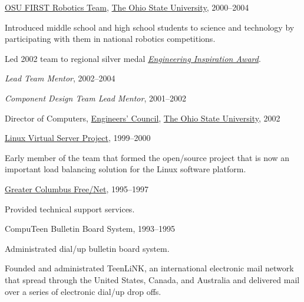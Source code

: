 \documentclass[10pt]{article}
\newcommand{\halfblankline}{\quad\vspace{-0.5\baselineskip}\pagebreak[3]}
\begin{document}
\halfblankline

\href{http://www.osufirst.org/}{OSU FIRST Robotics Team},
\href{http://www.osu.edu}{The Ohio State University}, 2000--2004
\begin{innerlist}
\item Introduced middle school and high school students to science and
        technology by participating with them in national robotics
        competitions.
\item Led 2002 team to regional silver medal
        \href{http://www.firstwiki.org/Engineering_Inspiration_Award}
             {\emph{Engineering Inspiration Award}}.
\item \emph{Lead Team Mentor}, 2002--2004
\item \emph{Component Design Team Lead Mentor}, 2001--2002
\end{innerlist}

\halfblankline

Director of Computers,
\href{http://ec.osu.edu/}{Engineers' Council},
\href{http://www.osu.edu/}{The Ohio State University}, 2002

\halfblankline

\href{http://www.linuxvirtualserver.org/}
     {Linux Virtual Server Project}, 1999--2000
\begin{innerlist}
\item Early member of the team that formed the open\-/source project that
        is now an important load balancing solution for the Linux
        software platform.
\end{innerlist}

\halfblankline

\href{http://www.gcfn.org/}
     {Greater Columbus Free\-/Net}, 1995--1997
\begin{innerlist}
\item Provided technical support services.
\end{innerlist}

\halfblankline

CompuTeen Bulletin Board System, 1993--1995
\begin{innerlist}
\item Administrated dial\-/up bulletin board system.
\item Founded and administrated TeenLiNK, an international electronic
        mail network that spread through the United States, Canada, and
        Australia and delivered mail over a series of electronic dial\-/up
        drop offs.
\end{innerlist}
\end{document}
